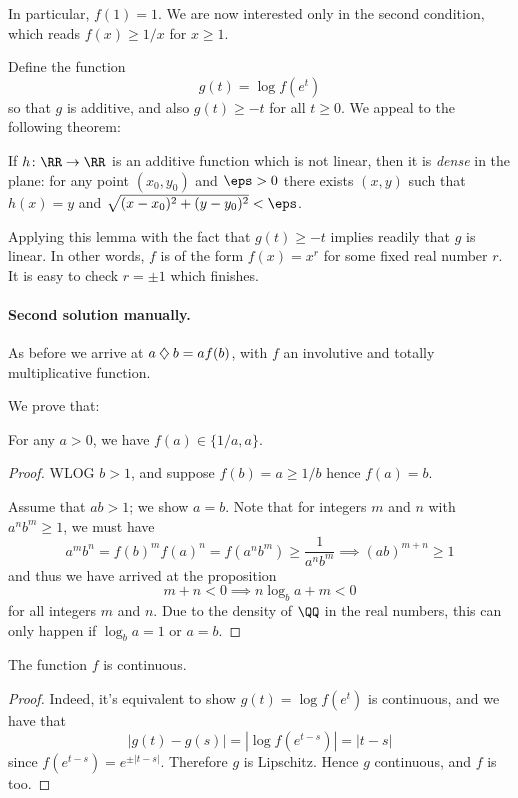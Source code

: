In particular, $f(1) = 1$.
We are now interested only in the second condition,
which reads $f(x) \ge 1/x$ for $x \ge 1$.

Define the function
\[ g(t) = \log f(e^t) \]
so that $g$ is additive,
and also $g(t) \ge -t$ for all $t \ge 0$.
We appeal to the following theorem:
\begin{lemma*}
  If $h \colon \RR \to \RR$ is an additive function
  which is not linear,
  then it is \emph{dense} in the plane:
  for any point $(x_0, y_0)$ and $\eps > 0$
  there exists $(x,y)$ such that $h(x) = y$
  and $\sqrt{(x-x_0)^2 + (y-y_0)^2} < \eps$.
\end{lemma*}
Applying this lemma with the fact
that $g(t) \ge -t$ implies readily that $g$ is linear.
In other words, $f$ is of the form $f(x) = x^r$
for some fixed real number $r$.
It is easy to check $r =\pm 1$ which finishes.

\paragraph{Second solution manually.}
As before we arrive at $a \mathbin{\diamondsuit} b = af(b)$,
with $f$ an involutive and totally multiplicative function.

We prove that:
\begin{claim*}
  For any $a > 0$, we have $f(a) \in \{1/a, a\}$.
\end{claim*}
\begin{proof}
  WLOG $b > 1$, and suppose $f(b) = a \ge 1/b$ hence $f(a) = b$.

  Assume that $ab > 1$; we show $a = b$.
  Note that for integers $m$ and $n$ with $a^n b^m \ge 1$, we must have
  \[ a^m b^n = f(b)^m f(a)^n
    = f(a^n b^m) \ge \frac{1}{a^n b^m} \implies (ab)^{m+n} \ge 1 \]
  and thus we have arrived at the proposition
  \[ m+n < 0 \implies n \log_b a + m < 0 \]
  for all integers $m$ and $n$.
  Due to the density of $\QQ$ in the real numbers,
  this can only happen if $\log_b a = 1$ or $a = b$.
\end{proof}

\begin{claim*}
  The function $f$ is continuous.
\end{claim*}
\begin{proof}
  Indeed, it's equivalent to show $g(t) = \log f(e^t)$ is continuous, and we have that
  \[
    \left\lvert g(t)-g(s) \right\rvert = \left\lvert \log f(e^{t-s}) \right\rvert
    = \left\lvert t-s \right\rvert
  \]
  since $f(e^{t-s}) = e^{\pm |t-s|}$.
  Therefore $g$ is Lipschitz.
  Hence $g$ continuous, and $f$ is too.
\end{proof}

